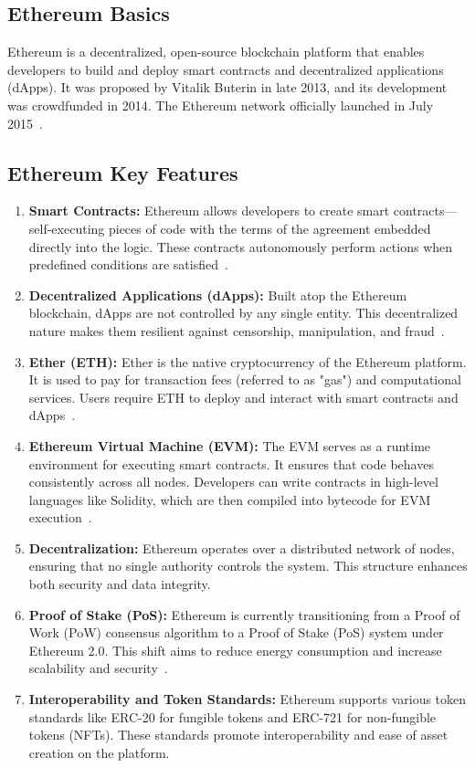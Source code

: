 \subsection{Ethereum Basics}
Ethereum is a decentralized, open-source blockchain platform that enables developers to build and deploy smart contracts and decentralized applications (dApps). It was proposed by Vitalik Buterin in late 2013, and its development was crowdfunded in 2014. The Ethereum network officially launched in July 2015~\cite{buterin2014whitepaper,wood2014ethereum}.

\subsection{Ethereum Key Features}
\begin{enumerate}
  \item \textbf{Smart Contracts:} Ethereum allows developers to create smart contracts—self-executing pieces of code with the terms of the agreement embedded directly into the logic. These contracts autonomously perform actions when predefined conditions are satisfied~\cite{wood2014ethereum}.
  
  \item \textbf{Decentralized Applications (dApps):} Built atop the Ethereum blockchain, dApps are not controlled by any single entity. This decentralized nature makes them resilient against censorship, manipulation, and fraud~\cite{buterin2014whitepaper}.
  
  \item \textbf{Ether (ETH):} Ether is the native cryptocurrency of the Ethereum platform. It is used to pay for transaction fees (referred to as "gas") and computational services. Users require ETH to deploy and interact with smart contracts and dApps~\cite{wood2014ethereum}.
  
  \item \textbf{Ethereum Virtual Machine (EVM):} The EVM serves as a runtime environment for executing smart contracts. It ensures that code behaves consistently across all nodes. Developers can write contracts in high-level languages like Solidity, which are then compiled into bytecode for EVM execution~\cite{wood2014ethereum}.
  
  \item \textbf{Decentralization:} Ethereum operates over a distributed network of nodes, ensuring that no single authority controls the system. This structure enhances both security and data integrity.
  
  \item \textbf{Proof of Stake (PoS):} Ethereum is currently transitioning from a Proof of Work (PoW) consensus algorithm to a Proof of Stake (PoS) system under Ethereum 2.0. This shift aims to reduce energy consumption and increase scalability and security~\cite{buterin2014whitepaper,wood2014ethereum}.
  
  \item \textbf{Interoperability and Token Standards:} Ethereum supports various token standards like ERC-20 for fungible tokens and ERC-721 for non-fungible tokens (NFTs). These standards promote interoperability and ease of asset creation on the platform.
\end{enumerate}

